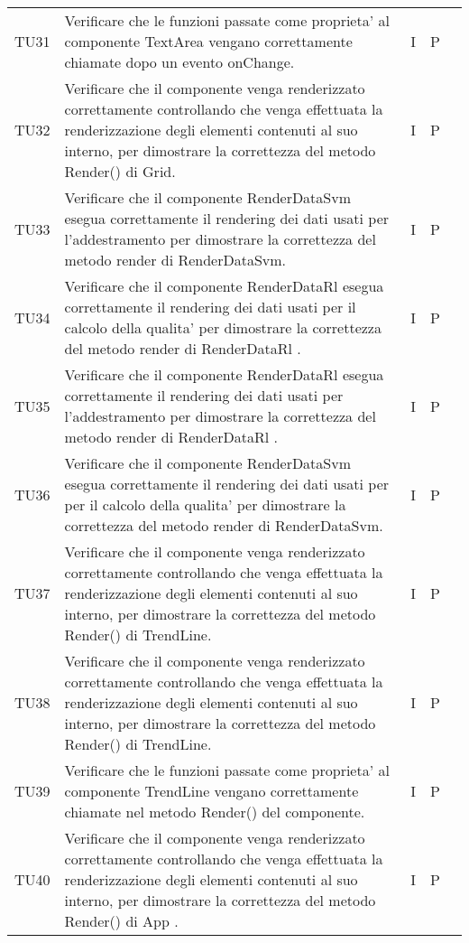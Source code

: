 \begin{longtable} {
		>{}p{15mm} 
		>{}p{79.5mm}
		>{}p{15mm} 
		>{}p{15mm}
		>{}p{0mm}}
	TU31		& Verificare che le funzioni passate come proprieta' al componente TextArea vengano correttamente chiamate dopo un evento onChange.& I & P &\TBstrut \\ [2mm]	
	TU32		& Verificare che il componente venga renderizzato correttamente controllando che venga effettuata la renderizzazione degli elementi contenuti al suo interno, per dimostrare la correttezza del metodo Render() di  Grid.& I & P &\TBstrut \\ [2mm]	
	TU33		& Verificare che il componente RenderDataSvm esegua correttamente il rendering dei dati usati per l'addestramento per dimostrare la correttezza del metodo render di RenderDataSvm.& I & P &\TBstrut \\ [2mm]
	TU34		& Verificare che il componente RenderDataRl esegua correttamente il rendering dei dati usati per il calcolo della qualita' per dimostrare la correttezza del metodo render di RenderDataRl .& I & P &\TBstrut \\ [2mm]
	TU35		& Verificare che il componente RenderDataRl esegua correttamente il rendering dei dati usati per l'addestramento per dimostrare la correttezza del metodo render di RenderDataRl .& I & P &\TBstrut \\ [2mm]
	TU36		& Verificare che il componente RenderDataSvm esegua correttamente il rendering dei dati usati per per il calcolo della qualita' per dimostrare la correttezza del metodo render di RenderDataSvm.& I & P &\TBstrut \\ [2mm]
	TU37		& Verificare che il componente venga renderizzato correttamente controllando che venga effettuata la renderizzazione degli elementi contenuti al suo interno, per dimostrare la correttezza del metodo Render() di  TrendLine.& I & P &\TBstrut \\ [2mm]
	TU38		& Verificare che il componente venga renderizzato correttamente controllando che venga effettuata la renderizzazione degli elementi contenuti al suo interno, per dimostrare la correttezza del metodo Render() di  TrendLine.& I & P &\TBstrut \\ [2mm]
	TU39		& Verificare che le funzioni passate come proprieta' al componente TrendLine vengano correttamente chiamate nel metodo Render() del componente.& I & P &\TBstrut \\ [2mm]
	TU40		& Verificare che il componente venga renderizzato correttamente controllando che venga effettuata la renderizzazione degli elementi contenuti al suo interno, per dimostrare la correttezza del metodo Render() di  App .& I & P &\TBstrut \\ [2mm]
	

\end{longtable}
